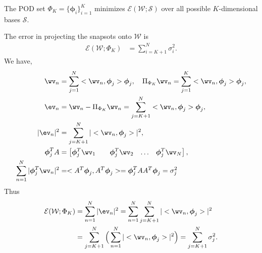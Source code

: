 \documentclass[11pt]{article}
\newcommand{\phiv}{\boldsymbol{\phi}}
\newcommand{\alphav}{\boldsymbol{\alpha}}
\newcommand{\Ec}{{\mathcal E}}
\newcommand{\Sc}{\mathcal{S}}
\newcommand{\Wc}{\mathcal{W}}
\begin{document}
 The POD set $\Phi_K =\big\{ \phiv_i \big\}_{i=1}^K$ minimizes $\Ec(\Wc;\Sc)$ over all possible $K$-dimensional
bases $\Sc$.

 The error in projecting the snapsots onto $\Wc$ is
\begin{align*} 
   \Ec(\Wc;\Phi_K) &= \sum_{i=K+1}^N \sigma_i^2 . 
\end{align*}
 We have, 
\begin{align*} 
  \wv_n & = \sum_{j=1}^N <\wv_n,\phiv_j> \phiv_j,  \quad  \Pi_{\Phi_K}\wv_n   = \sum_{j=1}^K <\wv_n,\phiv_j> \phiv_j , \\
  \ev_n &= \wv_n - \Pi_{\Phi_K}\wv_n   = \sum_{j=K+1}^N <\wv_n,\phiv_j> \phiv_j , \\
  |\ev_n|^2 &= \sum_{j=K+1}^N |<\wv_n,\phiv_j>|^2 , \\
   \phiv_j ^T A  &= \begin{bmatrix} \phiv_j^T \wv_1 && \phiv_j^T \wv_2 & \ldots & \phiv_j^T \wv_N \end{bmatrix}, \\
  \sum_{n=1}^N  |\phiv_j^T \wv_n|^2 &=  <A^T\phiv_j, A^T\phiv_j> =  \phiv_j ^T A A^T \phiv_j = \sigma_j^2
\end{align*}
Thus
\begin{align*} 
   \Ec(\Wc;\Phi_K) &= \sum_{n=1}^N |\ev_n|^2 = \sum_{n=1}^N \sum_{j=K+1}^N |<\wv_n,\phiv_j>|^2  \\
      & = \sum_{j=K+1}^N \Big( \sum_{n=1}^N |<\wv_n,\phiv_j>|^2 \Big) = \sum_{j=K+1}^N \sigma_j^2 .
\end{align*}

\newcommand{\wvBar}{\bar{\wv}}
\newcommand{\wvTilde}{\widetilde{\wv}}
\newcommand{\qp}{\alpha}%
\newcommand{\qpv}{\alphav}%

\clearpage



\clearpage


\clearpage



\clearpage


\clearpage

\end{document}
